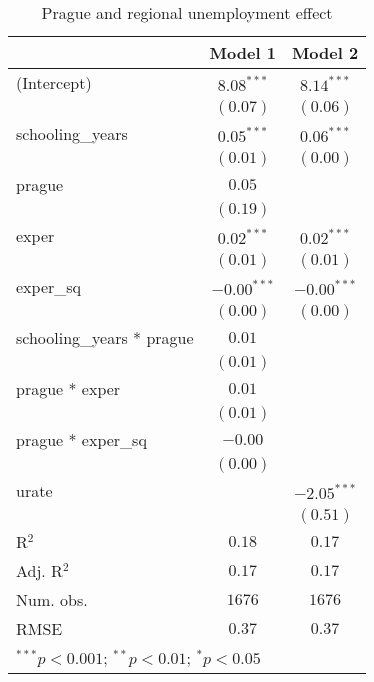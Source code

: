 
\begin{table}
\caption{Prague and regional unemployment effect}
\begin{center}
\begin{tabular}{l c c}
\hline
 & Model 1 & Model 2 \\
\hline
(Intercept)               & $8.08^{***}$  & $8.14^{***}$  \\
                          & $(0.07)$      & $(0.06)$      \\
schooling\_years          & $0.05^{***}$  & $0.06^{***}$  \\
                          & $(0.01)$      & $(0.00)$      \\
prague                    & $0.05$        &               \\
                          & $(0.19)$      &               \\
exper                     & $0.02^{***}$  & $0.02^{***}$  \\
                          & $(0.01)$      & $(0.01)$      \\
exper\_sq                 & $-0.00^{***}$ & $-0.00^{***}$ \\
                          & $(0.00)$      & $(0.00)$      \\
schooling\_years * prague & $0.01$        &               \\
                          & $(0.01)$      &               \\
prague * exper            & $0.01$        &               \\
                          & $(0.01)$      &               \\
prague * exper\_sq        & $-0.00$       &               \\
                          & $(0.00)$      &               \\
urate                     &               & $-2.05^{***}$ \\
                          &               & $(0.51)$      \\
\hline
R$^2$                     & $0.18$        & $0.17$        \\
Adj. R$^2$                & $0.17$        & $0.17$        \\
Num. obs.                 & $1676$        & $1676$        \\
RMSE                      & $0.37$        & $0.37$        \\
\hline
\multicolumn{3}{l}{\scriptsize{$^{***}p<0.001$; $^{**}p<0.01$; $^{*}p<0.05$}}
\end{tabular}
\label{table:coefficients}
\end{center}
\end{table}
